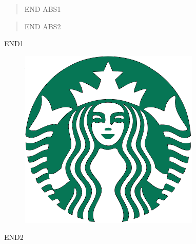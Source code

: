 \documentclass[12pt,a4paper]{article}
\begin{document}
\begin{multicols}{2}

\begin{abstract}
	\lipsum END ABS1
\end{abstract}

\begin{abstract}
	\lipsum END ABS2
\end{abstract}

\end{multicols}



\begin{multicols}{2}
\lipsum END1




\begin{figure}[H]

	\centering

	\includegraphics[width=\columnwidth,keepaspectratio]{image.png}
	\label{Label da imagem} 

\end{figure}

\lipsum END2




\begin{figure}[!ht]


\end{figure}
\end{multicols}
\end{document}

